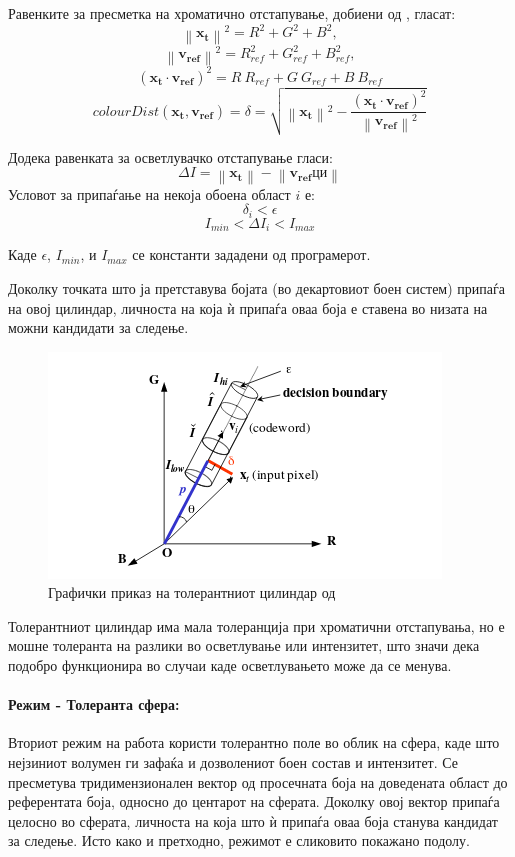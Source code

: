 \documentclass[12pt]{article}
\newcommand\norm[1]{\left\lVert#1\right\rVert}
\renewcommand{\vec}[1]{\mathbf{#1}}
\begin{document}
        Равенките за пресметка на хроматично отстапување, добиени од \cite{kim}, гласат:
        $$  \norm{\vec{x_t}}^2 = R^2 + G^2 + B^2,$$
        $$  \norm{\vec{v_{ref}}}^2 = R_{ref}^2 + G_{ref}^2 + B_{ref}^2, $$
        $$    (\vec{x_t} \cdot \vec{v_{ref}})^2 = R\ R_{ref} + G\ G_{ref} + B\ B_{ref} $$
        $$    colourDist(\vec{x_t}, \vec{v_{ref}}) = \delta = \sqrt{\norm{\vec{x_t}}^2 - \frac{(\vec{x_t} \cdot \vec{v_{ref}})^2}{\norm{\vec{v_{ref}}}^2}} $$
        \bigbreak

        Додека равенката за осветлувачко отстапување гласи:
        $$ \Delta I = \norm{\vec{x_t}} - \norm{\vec{v_{ref}} ци} $$
        \bigbreak
        Условот за припаѓање на некоја обоена област $i$ е:
        $$ \delta_{i} < \epsilon $$
        $$ I_{min}< \Delta I_i < I_{max} $$

        Каде $\epsilon$, $I_{min}$, и $I_{max}$ се константи зададени од програмерот.

        Доколку точката што ја претставува бојата (во декартовиот боен систем) припаѓа на овој цилиндар, личноста на која ѝ припаѓа оваа боја е ставена во низата на можни кандидати за следење.
        \begin{figure}[H]
          \centering
          \includegraphics[width = 0.4\linewidth]{./images/cylinder.png}
          \caption{Графички приказ на толерантниот цилиндар од \cite{kim}}
          \label{fig:cylinder}
        \end{figure}

        Толерантниот цилиндар има мала толеранција при хроматични отстапувања, но е мошне толеранта на разлики во осветлување или интензитет, што значи дека подобро функционира во случаи каде осветлувањето може да се менува.

      \paragraph{Режим - Толеранта сфера:\\}
        Вториот режим на работа користи толерантно поле во облик на сфера, каде што нејзиниот волумен ги зафаќа и дозволениот боен состав и интензитет. Се пресметува тридимензионален вектор од просечната боја на доведената област до референтата боја, односно до центарот на сферата. Доколку овој вектор припаѓа целосно во сферата, личноста на која што ѝ припаѓа оваа боја станува кандидат за следење. Исто како и претходно, режимот е сликовито покажано подолу.
\end{document}
